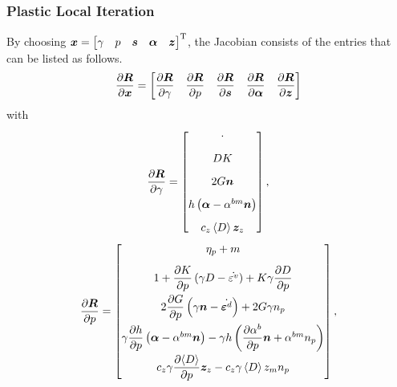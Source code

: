 \subsubsection{Plastic Local Iteration}
By choosing $\bm{x}=\begin{bmatrix}\gamma&p&\bm{s}&\bm{\alpha}&\bm{z}\end{bmatrix}^{\mathrm{T}}$, the Jacobian consists of the entries that can be listed as follows.
\begin{gather}\label{eq:dm_dr}
\dfrac{\partial{\bm{R}}}{\partial{\bm{x}}}=\begin{bmatrix}
\dfrac{\partial{\bm{R}}}{\partial{\gamma}}&\dfrac{\partial{\bm{R}}}{\partial{p}}&\dfrac{\partial{\bm{R}}}{\partial{\bm{s}}}&\dfrac{\partial{\bm{R}}}{\partial{\bm{\alpha}}}&\dfrac{\partial{\bm{R}}}{\partial{\bm{z}}}
\end{bmatrix}
\end{gather}
with
\begin{gather}
\dfrac{\partial{\bm{R}}}{\partial{\gamma}}=
\begin{bmatrix}
	\cdot                                           \\[3mm]
	DK                                              \\[3mm]
	2G\bm{n}                                  \\[3mm]
	h\left(\bm{\alpha}-\alpha^{bm}\bm{n}\right)   \\[3mm]
	c_z\left\langle{}D\right\rangle{}\bm{z}_z
\end{bmatrix},
\end{gather}
\begin{gather}
\dfrac{\partial{\bm{R}}}{\partial{p}}=
\begin{bmatrix}
	\eta_p+m                                                                                                                                \\[3mm]
	1+\dfrac{\partial{K}}{\partial{p}}\left(\gamma{}D-\dot{\varepsilon^v}\right)+K\gamma\dfrac{\partial{D}}{\partial{p}}                                                          \\[3mm]
	2\dfrac{\partial{G}}{\partial{p}}\left(\gamma\bm{n}-\dot{\bm{\varepsilon}^d}\right)+2G\gamma{}n_p                                                          \\[3mm]
	\gamma{}\dfrac{\partial{h}}{\partial{p}}\left(\bm{\alpha}-\alpha^{bm}\bm{n}\right)-\gamma{}h\left(\dfrac{\partial{\alpha^b}}{\partial{p}}\bm{n}+\alpha^{bm}n_p\right) \\[3mm]
	c_z\gamma{}\dfrac{\partial{\left\langle{}D\right\rangle}}{\partial{p}}\bm{z}_z-c_z\gamma{}\left\langle{}D\right\rangle{}z_m{}n_p
\end{bmatrix},
\end{gather}
